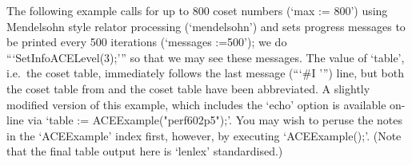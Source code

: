 \endexample


The following example calls {\ACE} for up to 800 coset  numbers  (`max
:= 800') using Mendelsohn style relator processing (`mendelsohn')  and
sets progress messages to be printed every 500  iterations  (`messages
:=500'); we do ```SetInfoACELevel(3);''' so  that  we  may  see  these
messages.  The  value  of  `table',  i.e.~the  {\GAP}   coset   table,
immediately follows the last {\ACE}  message  (```\#I ''')  line,  but
both the coset table from {\ACE} and the {\GAP} coset table have  been
abbreviated. A  slightly  modified  version  of  this  example,  which
includes  the  `echo'  option  is  available  on-line  via  `table  :=
ACEExample("perf602p5");'. You may wish to peruse  the  notes  in  the
`ACEExample' index first, however, by executing `ACEExample();'. (Note
that the final table output here is `lenlex'  standardised.)

